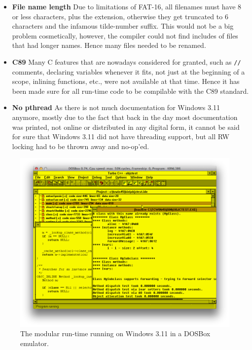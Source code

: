 \begin{itemize}
  \item{\bf{File name length}} Due to limitations of FAT-16, all filenames must have 8 or less characters, plus the extension, otherwise they get truncated to 6 characters and the infamous tilde-number suffix. This would not be a big problem cosmetically, however, the compiler could not find includes of files that had longer names. Hence many files needed to be renamed.
  \item{\bf{C89}} Many C features that are nowadays considered for granted, such as \verb=//= comments, declaring variables whenever it fits, not just at the beginning of a scope, inlining functions, etc., were not available at that time. Hence it has been made sure for all run-time code to be compilable with the C89 standard.
  \item{\bf{No pthread}} As there is not much documentation for Windows 3.11 anymore, mostly due to the fact that back in the day most documentation was printed, not online or distributed in any digital form, it cannot be said for sure that Windows 3.11 did not have threading support, but all RW locking had to be thrown away and no-op'ed. 
\end{itemize}

\begin{figure}[H]
  \includegraphics[width=\textwidth]{img/dos_box_3_11.png}
  
  \centering{}
  \caption{The modular run-time running on Windows 3.11 in a DOSBox emulator.}
  \label{fig:win_3_11}
\end{figure}

